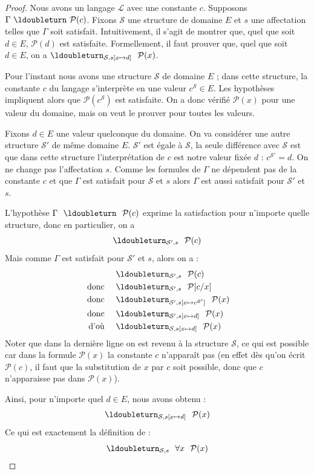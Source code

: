 \documentclass[11pt,class=report,crop=false]{standalone}
\begin{document}
\begin{proof}
	Nous avons un langage $\mathcal{L}$ avec une constante $c$.
	Supposons $\Gamma \ \ldoubleturn \ \mathcal{P}(c)$.
	Fixons $\mathcal{S}$ une structure de domaine $E$ et $s$ une affectation telles que $\Gamma$ soit satisfait.
	Intuitivement, il s'agit de montrer que, quel que soit $d \in E$, $\mathcal{P}(d)$ est satisfaite. Formellement, il faut prouver que, quel que soit $d \in E$, on a $\ldoubleturn_{\mathcal{S},s[x \mapsto d]} \ \ \mathcal{P}(x)$.
	
	
	Pour l'instant nous avons une structure $\mathcal{S}$ de domaine $E$ ;
	dans cette structure, la constante $c$ du langage s'interprète en une valeur $c^{\mathcal{S}} \in E$. Les hypothèses impliquent alors que $\mathcal{P}(c^\mathcal{S})$ est satisfaite. On a donc vérifié $\mathcal{P}(x)$ pour une valeur du domaine, mais on veut le prouver pour toutes les valeurs.
	
	Fixons $d \in E$ une valeur quelconque du domaine. On va considérer une autre structure $\mathcal{S}'$ de même domaine $E$. $\mathcal{S}'$ est égale à $\mathcal{S}$, la seule différence avec $\mathcal{S}$ est que dans cette structure l'interprétation de $c$ est notre valeur fixée $d$ : $c^{\mathcal{S}'} = d$. On ne change pas l'affectation $s$.
	Comme les formules de $\Gamma$ ne dépendent pas de la constante $c$ et que $\Gamma$ est satisfait pour $\mathcal{S}$ et $s$ alors $\Gamma$ est aussi satisfait pour $\mathcal{S}'$ et $s$.

	L'hypothèse $\Gamma \ \ \ldoubleturn \ \ \mathcal{P}(c)$ exprime la satisfaction pour n'importe quelle structure, donc en particulier, on a 
	\[
	  \ldoubleturn_{\mathcal{S}',s} \ \ \mathcal{P}(c)
	\]
	Mais comme $\Gamma$ est satisfait pour $\mathcal{S}'$ et $s$, alors on a :
	\begin{align*}
				  			& \ldoubleturn_{\mathcal{S}',s} \ \ \mathcal{P}(c) \\
	\text{ donc } \quad		& \ldoubleturn_{\mathcal{S}',s} \ \ \mathcal{P}[c/x] \\
	\text{ donc } \quad		& \ldoubleturn_{\mathcal{S}',s[x \mapsto c^{\mathcal{S}'}]} \ \ \mathcal{P}(x) \\
	\text{ donc } \quad		& \ldoubleturn_{\mathcal{S}',s[x \mapsto d]} \ \ \mathcal{P}(x) \\
	\text{ d'où } \quad		& \ldoubleturn_{\mathcal{S},s[x \mapsto d]} \ \ \mathcal{P}(x)		
	\end{align*} 
	Noter que dans la dernière ligne on est revenu à la structure $\mathcal{S}$, ce qui est possible car dans la formule $\mathcal{P}(x)$ la constante $c$ n'apparaît pas (en effet dès qu'on écrit $\mathcal{P}(c)$, il faut que la substitution de $x$ par $c$ soit possible, donc que $c$ n'apparaisse pas dans $\mathcal{P}(x)$). 
	
	Ainsi, pour n'importe quel $d \in E$, nous avons obtenu :
	\[
	\ldoubleturn_{\mathcal{S},s[x \mapsto d]} \ \ \mathcal{P}(x)
	\]
	Ce qui est exactement la définition de :
	\[
	\ldoubleturn_{\mathcal{S},s} \ \ \forall x \ \ \mathcal{P}(x)
	\]
\end{proof}
\end{document}
